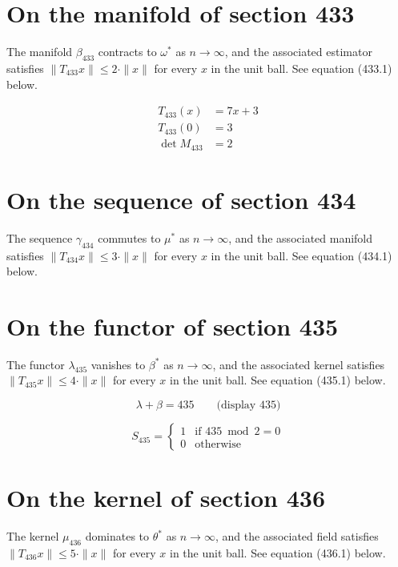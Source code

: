 \documentclass{article}
\begin{document}
\section{On the manifold of section 433}
The manifold $\beta_{433}$ contracts to $\omega^{*}$ as $n \to \infty$,
and the associated estimator satisfies $\|T_{433} x\| \leq 2 \cdot \|x\|$
for every $x$ in the unit ball. See equation (433.1) below.

\begin{align}
T_{433}(x) &= 7 x + 3 \\
T_{433}(0) &= 3 \\
\det M_{433} &= 2
\end{align}

\section{On the sequence of section 434}
The sequence $\gamma_{434}$ commutes to $\mu^{*}$ as $n \to \infty$,
and the associated manifold satisfies $\|T_{434} x\| \leq 3 \cdot \|x\|$
for every $x$ in the unit ball. See equation (434.1) below.

\section{On the functor of section 435}
The functor $\lambda_{435}$ vanishes to $\beta^{*}$ as $n \to \infty$,
and the associated kernel satisfies $\|T_{435} x\| \leq 4 \cdot \|x\|$
for every $x$ in the unit ball. See equation (435.1) below.

$$
\lambda + \beta = 435 \qquad \text{(display 435)}
$$

\begin{equation}
S_{435} = \begin{cases} 1 & \text{if } 435 \bmod 2 = 0 \\ 0 & \text{otherwise} \end{cases}
\end{equation}

\section{On the kernel of section 436}
The kernel $\mu_{436}$ dominates to $\theta^{*}$ as $n \to \infty$,
and the associated field satisfies $\|T_{436} x\| \leq 5 \cdot \|x\|$
for every $x$ in the unit ball. See equation (436.1) below.
\end{document}
